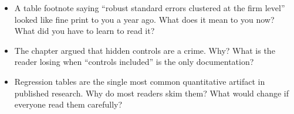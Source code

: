 \documentclass[
  letterpaper,
  11pt,
  twoside,
  openany]{scrbook}
\providecommand{\tightlist}{%
  \setlength{\itemsep}{0pt}\setlength{\parskip}{0pt}}
\begin{document}
\begin{tcolorbox}[enhanced jigsaw, arc=.35mm, bottomrule=.15mm, bottomtitle=1mm, breakable, colback=white, colbacktitle=quarto-callout-caution-color!10!white, colframe=quarto-callout-caution-color-frame, coltitle=black, left=2mm, leftrule=.75mm, opacityback=0, opacitybacktitle=0.6, rightrule=.15mm, title=\textcolor{quarto-callout-caution-color}{\faFire}\hspace{0.5em}{Reflect before moving on}, titlerule=0mm, toprule=.15mm, toptitle=1mm]

\begin{itemize}
\tightlist
\item
  A table footnote saying ``robust standard errors clustered at the firm
  level'' looked like fine print to you a year ago. What does it mean to
  you now? What did you have to learn to read it?
\item
  The chapter argued that hidden controls are a crime. Why? What is the
  reader losing when ``controls included'' is the only documentation?
\item
  Regression tables are the single most common quantitative artifact in
  published research. Why do most readers skim them? What would change
  if everyone read them carefully?
\end{itemize}

\end{tcolorbox}
\end{document}
